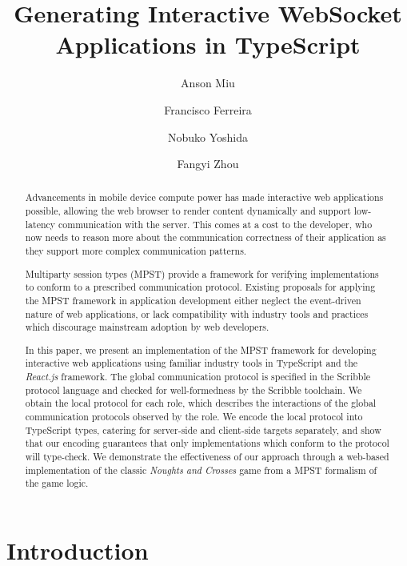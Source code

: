\documentclass[submission,copyright,creativecommons]{eptcs}
\title{Generating Interactive WebSocket Applications in TypeScript}
\author{Anson Miu
\institute{Imperial College London}
\and
Francisco Ferreira
\institute{Imperial College London}
\and
Nobuko Yoshida
\institute{Imperial College London}
\and
Fangyi Zhou
\institute{Imperial College London}
}
\begin{document}
\maketitle

\begin{abstract}
Advancements in mobile device compute power has made interactive web applications possible, allowing the web browser to render content dynamically and support low-latency communication with the server. This comes at a cost to the developer, who now needs to reason more about the communication correctness of their application as they support more complex communication patterns. 

Multiparty session types (MPST) provide a framework for verifying implementations to conform to a prescribed communication protocol. Existing proposals for applying the MPST framework in application development either neglect the event-driven nature of web applications, or lack compatibility with industry tools and practices which discourage mainstream adoption by web developers.

In this paper, we present an implementation of the MPST framework for developing interactive web applications using familiar industry tools in TypeScript and the \textit{React.js} framework. The global communication protocol is specified in the Scribble protocol language and checked for well-formedness by the Scribble toolchain. We obtain the local protocol for each role, which describes the interactions of the global communication protocols observed by the role. We encode the local protocol into TypeScript types, catering for server-side and client-side targets separately, and show that our encoding guarantees that only implementations which conform to the protocol will type-check. We demonstrate the effectiveness of our approach through a web-based implementation of the classic \textit{Noughts and Crosses} game from a MPST formalism of the game logic.

\end{abstract}

\section{Introduction}
\end{document}
